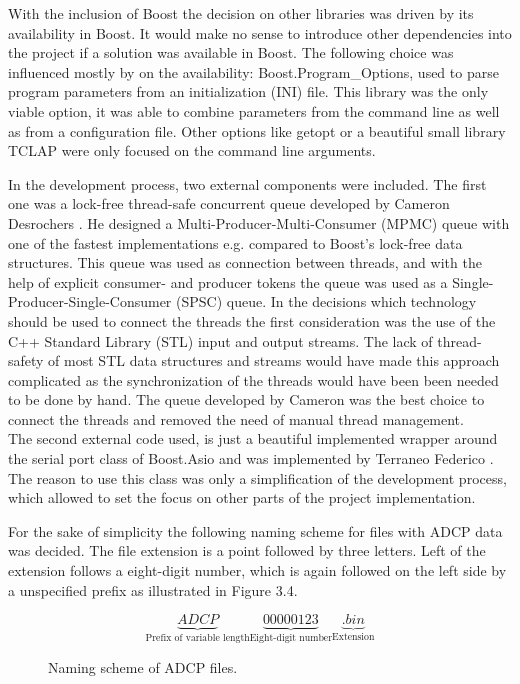 With the inclusion of Boost the decision on other libraries was driven by its availability in Boost. It would make no sense to introduce other dependencies into the project if a solution was available in Boost. The following choice was influenced mostly by on the availability: Boost.Program\_Options, used to parse program parameters from an initialization (INI) file. This library was the only viable option, it was able to combine parameters from the command line as well as from a configuration file. Other options like getopt \cite{getop} or a beautiful small library TCLAP \cite{tclap} were only focused on the command line arguments. 

In the development process, two external components were included. The first one was a lock-free thread-safe concurrent queue developed by Cameron Desrochers \cite{moody}. He designed a Multi-Producer-Multi-Consumer (MPMC) queue with one of the fastest implementations e.g. compared to Boost's lock-free data structures. This queue was used as connection between threads, and with the help of explicit consumer- and producer tokens the queue was used as a Single-Producer-Single-Consumer (SPSC) queue. In the decisions which technology should be used to connect the threads the first consideration was the use of the C++ Standard Library (STL) \cite{stl_stream} input and output streams. The lack of thread-safety of most STL data structures and streams would have made this approach complicated as the synchronization of the threads would have been been needed to be done by hand. The queue developed by Cameron was the best choice to connect the threads and removed the need of manual thread management.\\
The second external code used, is just a beautiful implemented wrapper around the serial port class of Boost.Asio and was implemented by Terraneo Federico \cite{serport}. The reason to use this class was only a simplification of the development process, which allowed to set the focus on other parts of the project implementation.

For the sake of simplicity the following naming scheme for files with ADCP data was decided. The file extension is a point followed by three letters. Left of the extension follows a eight-digit number, which is again followed on the left side by a unspecified prefix as illustrated in Figure 3.4.
\begin{figure}[!ht]
$$ \underbrace{ADCP}_{\text{Prefix of variable length}}\underbrace{00000123}_{\text{Eight-digit number}}\underbrace{.bin}_{\text{Extension}}$$
        \caption{Naming scheme of ADCP files.}
\end{figure}


